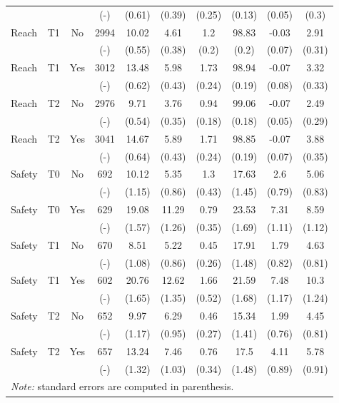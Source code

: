 \begin{table}[H]
{\begin{tabular}{lccccccccc}
 &  &  & (-) & (0.61) & (0.39) & (0.25) & (0.13) & (0.05) & (0.3) \\[0pt]
Reach & T1 & No & 2994 & 10.02 & 4.61 & 1.2 & 98.83 & -0.03 & 2.91 \\[0pt]
 &  &  & (-) & (0.55) & (0.38) & (0.2) & (0.2) & (0.07) & (0.31) \\[0pt]
Reach & T1 & Yes & 3012 & 13.48 & 5.98 & 1.73 & 98.94 & -0.07 & 3.32 \\[0pt]
 &  &  & (-) & (0.62) & (0.43) & (0.24) & (0.19) & (0.08) & (0.33) \\[0pt]
Reach & T2 & No & 2976 & 9.71 & 3.76 & 0.94 & 99.06 & -0.07 & 2.49 \\[0pt]
 &  &  & (-) & (0.54) & (0.35) & (0.18) & (0.18) & (0.05) & (0.29) \\[0pt]
Reach & T2 & Yes & 3041 & 14.67 & 5.89 & 1.71 & 98.85 & -0.07 & 3.88 \\[0pt]
 &  &  & (-) & (0.64) & (0.43) & (0.24) & (0.19) & (0.07) & (0.35) \\[0pt]
Safety & T0 & No & 692 & 10.12 & 5.35 & 1.3 & 17.63 & 2.6 & 5.06 \\[0pt]
 &  &  & (-) & (1.15) & (0.86) & (0.43) & (1.45) & (0.79) & (0.83) \\[0pt]
Safety & T0 & Yes & 629 & 19.08 & 11.29 & 0.79 & 23.53 & 7.31 & 8.59 \\[0pt]
 &  &  & (-) & (1.57) & (1.26) & (0.35) & (1.69) & (1.11) & (1.12) \\[0pt]
Safety & T1 & No & 670 & 8.51 & 5.22 & 0.45 & 17.91 & 1.79 & 4.63 \\[0pt]
 &  &  & (-) & (1.08) & (0.86) & (0.26) & (1.48) & (0.82) & (0.81) \\[0pt]
Safety & T1 & Yes & 602 & 20.76 & 12.62 & 1.66 & 21.59 & 7.48 & 10.3 \\[0pt]
 &  &  & (-) & (1.65) & (1.35) & (0.52) & (1.68) & (1.17) & (1.24) \\[0pt]
Safety & T2 & No & 652 & 9.97 & 6.29 & 0.46 & 15.34 & 1.99 & 4.45 \\[0pt]
 &  &  & (-) & (1.17) & (0.95) & (0.27) & (1.41) & (0.76) & (0.81) \\[0pt]
Safety & T2 & Yes & 657 & 13.24 & 7.46 & 0.76 & 17.5 & 4.11 & 5.78 \\[0pt]
 &  &  & (-) & (1.32) & (1.03) & (0.34) & (1.48) & (0.89) & (0.91) \\[0pt]
\bottomrule
\multicolumn{10}{l}{\textit{Note:} standard errors are computed in parenthesis.}
\end{tabular}
}
\end{table}
